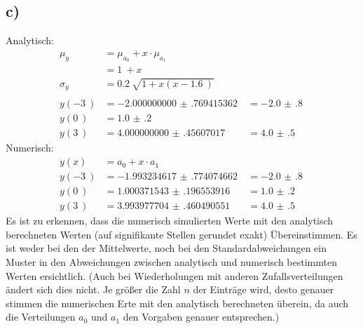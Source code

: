 \subsection{c)}
Analytisch:
\begin{align}
\mu_y &= \mu_{a_0} + x\cdot \mu_{a_1}\\
& = \SI{1}{}+ x\\
\sigma_y &= \SI{0.2}{}\sqrt{1+x(x-\SI{1.6}{})}\\ \\
y(\SI{-3}{})&=\SI{-2.000000000(769415362)}{}&=\SI{-2.0(8)}{}\\
y(\SI{0}{})&=\SI{1.0(2)}{}\\
y(\SI{3}{})&=\SI{4.000000000(456070170)}{}&=\SI{4.0(5)}{}
\end{align}
Numerisch:
\begin{align}
y(x) &= {a_0} + x\cdot {a_1}\\
y(\SI{-3}{})&=\SI{-1.993234617(774074662)}{}&=\SI{-2.0(8)}{}\\
y(\SI{0}{})&=\SI{1.000371543(196553916)}{}&=\SI{1.0(2)}{}\\
y(\SI{3}{})&=\SI{3.993977704(460490551)}{}&=\SI{4.0(5)}{}
\end{align}
Es ist zu erkennen, dass die numerisch simulierten Werte mit den analytisch berechneten Werten (auf signifikante Stellen gerundet exakt) Übereinstimmen. Es ist weder bei den der Mittelwerte, noch bei den Standardabweichungen ein Muster in den Abweichungen zwischen analytisch und numerisch bestimmten Werten ersichtlich.
\newline (Auch bei Wiederholungen mit anderen Zufallsverteilungen ändert sich dies nicht. Je größer die Zahl $n$ der Einträge wird, desto genauer stimmen die numerischen Erte mit den analytisch berechneten überein, da auch die Verteilungen $a_0$ und $a_1$ den Vorgaben genauer entsprechen.)
